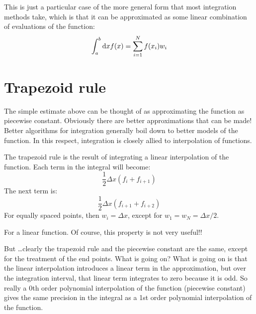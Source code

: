 This is just a particular case of the more general form that most
integration methods take, which is that it can be approximated as some
linear combination of evaluations of the function:
\begin{equation}
  \int_a^b {\rm d}x f(x) = \sum_{i=1}^N 
  f(x_i) w_i
\end{equation}

\section{Trapezoid rule}

The simple estimate above can be thought of as approximating the
function as piecewise constant. Obviously there are better
approximations that can be made! Better algorithms for integration
generally boil down to better models of the function. In this respect,
integration is closely allied to interpolation of functions.

The trapezoid rule is the result of integrating a linear interpolation
of the function. Each term in the integral will become:
\begin{equation}
\frac{1}{2} \Delta x \left( f_i + f_{i+1} \right) 
\end{equation}
The next term is:
\begin{equation}
\frac{1}{2} \Delta x \left( f_{i+1} + f_{i+2} \right) 
\end{equation}
For equally spaced points, then $w_i = \Delta x$, except for $w_1=
w_{N} = \Delta x/2$.


\begin{answer}
For a linear function. Of course, this property is not very useful!!
\end{answer}

But \ldots clearly the trapezoid rule and the piecewise constant are
the same, except for the treatment of the end points. What is going
on? What is going on is that the linear interpolation introduces a
linear term in the approximation, but over the integration interval,
that linear term integrates to zero because it is odd. So really a 0th
order polynomial interpolation of the function (piecewise constant)
gives the same precision in the integral as a 1st order polynomial
interpolation of the function.


